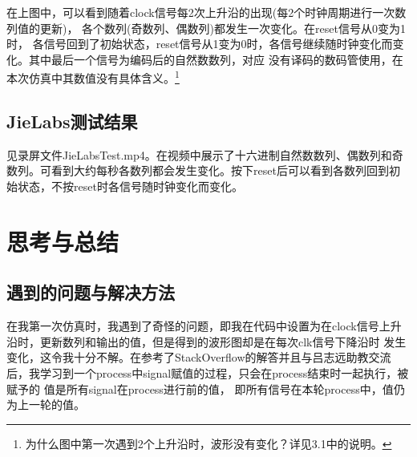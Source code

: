\documentclass[UTF8]{article}
\begin{document}
\qquad 在上图中，可以看到随着clock信号每2次上升沿的出现(每2个时钟周期进行一次数列值的更新)，
各个数列(奇数列、偶数列)都发生一次变化。在reset信号从0变为1时，
各信号回到了初始状态，reset信号从1变为0时，各信号继续随时钟变化而变化。其中最后一个信号为编码后的自然数数列，对应
没有译码的数码管使用，在本次仿真中其数值没有具体含义。\footnote{为什么图中第一次遇到2个上升沿时，波形没有变化？详见3.1中的说明。}


\subsection{JieLabs测试结果}
\qquad 见录屏文件JieLabsTest.mp4。在视频中展示了十六进制自然数数列、偶数列和奇数列。可看到大约每秒各数列都会发生变化。按下reset后可以看到各数列回到初始状态，不按reset时各信号随时钟变化而变化。




\section{思考与总结}
\subsection{遇到的问题与解决方法}

\qquad 在我第一次仿真时，我遇到了奇怪的问题，即我在代码中设置为在clock信号上升沿时，更新数列和输出的值，但是得到的波形图却是在每次clk信号下降沿时
发生变化，这令我十分不解。在参考了StackOverflow的解答并且与吕志远助教交流后，我学习到一个process中signal赋值的过程，只会在process结束时一起执行，被赋予的
值是所有signal在process进行前的值，
即所有信号在本轮process中，值仍为上一轮的值。
\end{document}
